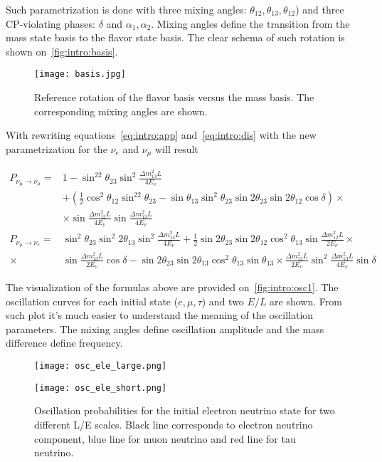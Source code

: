\documentclass[../main.tex]{subfiles}
\begin{document}
Such parametrization is done with three mixing angles: $\theta_{12}, \theta_{13}, \theta_{12}$) and three CP-violating phases: $\delta$ and $\alpha_1, \alpha_2$. Mixing angles define the transition from the mass state basis to the flavor state basis. The clear schema of such rotation is shown on~\autoref{fig:intro:basis}.

\begin{figure}[!ht]
  \centering
  \texttt{[image: basis.jpg]}
  \caption{Reference rotation of the flavor basis versus the mass basis. The corresponding mixing angles are shown.}
  \label{fig:intro:basis}
\end{figure}

With rewriting equations~\autoref{eq:intro:app} and~\autoref{eq:intro:dis} with the new parametrization for the $\nu_e$ and $\nu_\mu$ will result

\begin{align}
P_{\nu_\mu\to\nu_\mu}=&1-\sin^22\theta_{23}\sin^2\frac{\Delta m^2_{13}L}{4E_\nu} \\
&+\left(\frac{1}{2}\cos^2\theta_{12}\sin^22\theta_{23}-\sin\theta_{13}\sin^2\theta_{23}\sin2\theta_{23}\sin2\theta_{12}\cos\delta\right)\times \nonumber \\
&\times\sin\frac{\Delta m^2_{12}L}{4E_\nu}\sin\frac{\Delta m^2_{13}L}{4E_\nu}  \nonumber \\
P_{\nu_\mu\to\nu_e}=&\sin^2\theta_{23}\sin^2 2\theta_{13}\sin^2\frac{\Delta m^2_{13}L}{4E_\nu}+\frac{1}{2}\sin2\theta_{23}\sin2\theta_{12}\cos^2\theta_{13}\sin\frac{\Delta m^2_{12}L}{2E_\nu} \times \\
\times & \sin\frac{\Delta m^2_{13}L}{2E_\nu}\cos\delta-\sin2\theta_{23}\sin2\theta_{13}\cos^2\theta_{13}\sin\theta_{13}\times\frac{\Delta m_{12}^2L}{2E_\nu}\sin^2\frac{\Delta m^2_{13}L}{4E_\nu}\sin\delta \nonumber
\end{align}

The visualization of the formulas above are provided on~\autoref{fig:intro:osc1}. The oscillation curves for each initial state ($e, \mu, \tau$) and two $E/L$ are shown. From such plot it's much easier to understand the meaning of the oscillation parameters. The mixing angles define oscillation amplitude and the mass difference define frequency.

\begin{figure}[!ht]
\centering
\begin{minipage}{0.4\linewidth}
  \centering
  \texttt{[image: osc\_ele\_large.png]}
\end{minipage}
\hfill
\begin{minipage}{0.4\linewidth}
  \centering
  \texttt{[image: osc\_ele\_short.png]}
\end{minipage}
\caption{Oscillation probabilities for the initial electron neutrino state for two different L/E scales. Black line corresponds to electron neutrino component, blue line for muon neutrino and red line for tau neutrino.}
\label{fig:intro:osc1}
\end{figure}
\end{document}
